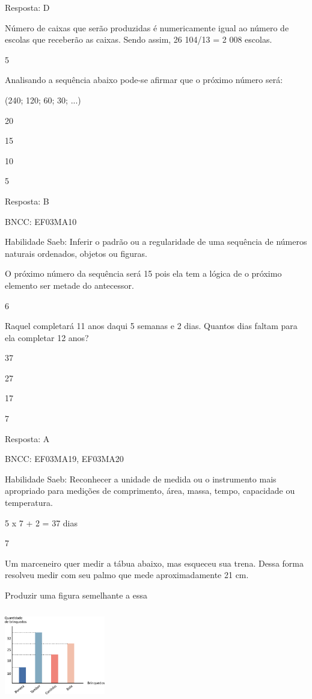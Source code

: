 \begin{escolha}
{\begin{escolha}
{Resposta: D

Número de caixas que serão produzidas é numericamente igual ao número de
escolas que receberão as caixas. Sendo assim, 26 104/13 = 2 008 escolas.

\num{5}

Analisando a sequência abaixo pode-se afirmar que o próximo número será:

(240; 120; 60; 30; ...)

\begin{escolha}
\item
  20
\item
  15
\item
  10
\item
  5
\end{escolha}

Resposta: B

BNCC: EF03MA10

Habilidade Saeb: Inferir o padrão ou a regularidade de uma sequência de
números naturais ordenados, objetos ou figuras.

O próximo número da sequência será 15 pois ela tem a lógica de o próximo
elemento ser metade do antecessor.

\num{6}

Raquel completará 11 anos daqui 5 semanas e 2 dias. Quantos dias faltam
para ela completar 12 anos?

\begin{escolha}
\item
  37
\item
  27
\item
  17
\item
  7
\end{escolha}

Resposta: A

BNCC: EF03MA19, EF03MA20

Habilidade Saeb: Reconhecer a unidade de medida ou o instrumento mais
apropriado para medições de comprimento, área, massa, tempo, capacidade
ou temperatura.

5 x 7 + 2 = 37 dias

\num{7}

Um marceneiro quer medir a tábua abaixo, mas esqueceu sua trena. Dessa
forma resolveu medir com seu palmo que mede aproximadamente 21 cm.

Produzir uma figura semelhante a essa

\includegraphics[width=1.73077in,height=1.57654in]{media/image119.png}

}
\end{escolha}}
\end{escolha}
